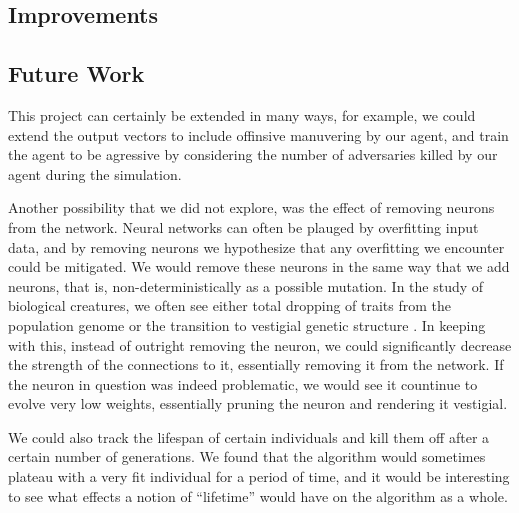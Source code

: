 \documentclass{article}
\begin{document}
\begin{multicols}{2}
\subsection{Improvements}
\blindtext
\blindtext

\subsection{Future Work}
This project can certainly be extended in many ways, for example, we could
extend the output vectors to include offinsive manuvering by our agent, and
train the agent to be agressive by considering the number of adversaries killed
by our agent during the simulation.

Another possibility that we did not explore, was the effect of removing neurons
from the network. Neural networks can often be plauged by overfitting input
data, and by removing neurons we hypothesize that any overfitting we encounter
could be mitigated. We would remove these neurons in the same way that we add
neurons, that is, non-deterministically as a possible mutation. In the study of
biological creatures, we often see either total dropping of traits from the
population genome or the transition to vestigial genetic structure
\cite{lehman}. In keeping with this, instead of outright removing the neuron, we
could significantly decrease the strength of the connections to it, essentially
removing it from the network. If the neuron in question was indeed problematic,
we would see it countinue to evolve very low weights, essentially pruning the
neuron and rendering it vestigial.

We could also track the lifespan of certain individuals and kill them off after
a certain number of generations. We found that the algorithm would sometimes
plateau with a very fit individual for a period of time, and it would be
interesting to see what effects a notion of ``lifetime'' would have on the
algorithm as a whole.

\end{multicols}

\\~\\
\hline
\\~\\
\end{document}

